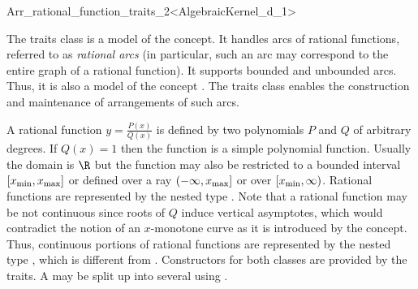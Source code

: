 
\ccRefPageBegin
\begin{ccRefClass}{Arr_rational_function_traits_2<AlgebraicKernel_d_1>}

\ccDefinition

The traits class \ccRefName{} is a model of the 
concept. It handles arcs of rational functions, referred to as
{\sl rational arcs} (in particular, such an arc may correspond to the
entire graph of a rational function). It supports bounded and
unbounded arcs. Thus, it is also a model of the concept
. The traits class enables
the construction and maintenance of arrangements of such arcs. 

A rational function $y = \frac{P(x)}{Q(x)}$ is defined by two polynomials 
$P$ and $Q$ of arbitrary degrees. 
If $Q(x) = 1$ then the function is a simple polynomial function.
Usually the domain is $\R$ but the function may also be 
restricted to a bounded interval $[x_{\rm min}, x_{\rm max}]$ 
or defined over a ray $(-\infty, x_{\rm max}]$ or over $[x_{\rm min}, \infty)$. 
Rational functions are represented by the nested type . 
Note that a rational function may be not continuous since roots of $Q$ induce 
vertical asymptotes, which would contradict the notion of an $x$-monotone curve
as it is introduced by the  concept. 
Thus, continuous portions of rational functions are represented by the nested 
type , which is different from .
Constructors for both classes are provided by the traits. 
A  may be split up into several 
using . 



\end{ccRefClass}
